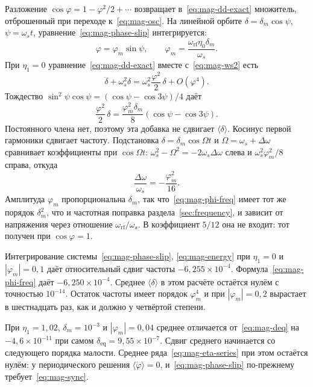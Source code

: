 Разложение $\cos\varphi=1-\varphi^2/2+\cdots$ возвращает в~\eqref{eq:mag-dd-exact} множитель, отброшенный при переходе к~\eqref{eq:mag-osc}. На линейной орбите $\delta=\delta_m\cos\psi$, $\psi=\omega_s t$, уравнение~\eqref{eq:mag-phase-slip} интегрируется:
\begin{equation}
\label{eq:mag-phi-lin}
\varphi=\varphi_m\sin\psi,
\qquad
\varphi_m=\frac{\omega_{\mathrm{rf}}\eta_0\delta_m}{\omega_s}.
\end{equation}
При $\eta_1=0$ уравнение~\eqref{eq:mag-dd-exact} вместе с~\eqref{eq:mag-ws2} есть
\begin{equation}
\label{eq:mag-cos-corr}
\ddot\delta+\omega_s^2\delta
=\omega_s^2\frac{\varphi^2}{2}\,\delta+O(\varphi^4).
\end{equation}
Тождество $\sin^2\psi\cos\psi=(\cos\psi-\cos 3\psi)/4$ даёт
\begin{equation}
\label{eq:mag-phi2-fourier}
\frac{\varphi^2}{2}\,\delta
=\frac{\varphi_m^2\delta_m}{8}(\cos\psi-\cos 3\psi).
\end{equation}
Постоянного члена нет, поэтому эта добавка не сдвигает $\langle\delta\rangle$. Косинус первой гармоники сдвигает частоту. Подстановка $\delta=\delta_m\cos\Omega t$ и $\Omega=\omega_s+\Delta\omega$ сравнивает коэффициенты при $\cos\Omega t$: $\omega_s^2-\Omega^2=-2\omega_s\Delta\omega$ слева и $\omega_s^2\varphi_m^2/8$ справа, откуда
\begin{equation}
\label{eq:mag-phi-freq}
\frac{\Delta\omega}{\omega_s}=-\frac{\varphi_m^2}{16}.
\end{equation}
Амплитуда $\varphi_m$ пропорциональна $\delta_m$, так что~\eqref{eq:mag-phi-freq} имеет тот же порядок $\delta_m^2$, что и частотная поправка раздела~\ref{sec:frequency}, и зависит от напряжения через отношение $\omega_{\mathrm{rf}}/\omega_s$. В коэффициент $5/12$ она не входит: тот получен при $\cos\varphi=1$.

Интегрирование системы~\eqref{eq:mag-phase-slip}, \eqref{eq:mag-energy} при $\eta_1=0$ и $|\varphi_m|=0{,}1$ даёт относительный сдвиг частоты $-6{,}255\times 10^{-4}$. Формула~\eqref{eq:mag-phi-freq} даёт $-6{,}250\times 10^{-4}$. Среднее $\langle\delta\rangle$ в этом расчёте остаётся нулём с точностью $10^{-14}$. Остаток частоты имеет порядок $\varphi_m^4$ и при $|\varphi_m|=0{,}2$ вырастает в шестнадцать раз, как и должно у четвёртой степени.

При $\eta_1=1{,}02$, $\delta_m=10^{-3}$ и $|\varphi_m|=0{,}04$ среднее отличается от~\eqref{eq:mag-deq} на $-4{,}6\times 10^{-11}$ при самом $\delta_{\mathrm{eq}}=9{,}55\times 10^{-7}$. Сдвиг среднего начинается со следующего порядка малости. Среднее ряда~\eqref{eq:mag-eta-series} при этом остаётся нулём: у периодического решения $\langle\dot\varphi\rangle=0$, и~\eqref{eq:mag-phase-slip} по-прежнему требует~\eqref{eq:mag-sync}.

